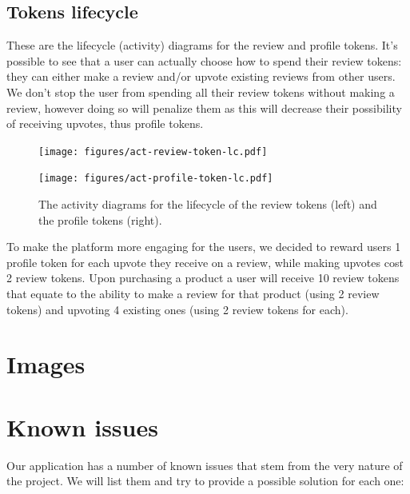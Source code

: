 \documentclass[12pt,a4paper,oneside]{article}
\theoremstyle{definition}
\begin{document}
\newpage

\subsection{Tokens lifecycle}

These are the lifecycle (activity) diagrams for the review and profile tokens.
It's possible to see that a user can actually choose how to spend their review tokens:
they can either make a review and/or upvote existing reviews from other users.
We don't stop the user from spending all their review tokens without making a review, however doing so will penalize them as this will decrease their possibility of receiving upvotes, thus profile tokens.

\begin{figure}[H]
	\centering
	\begin{minipage}{0.49\linewidth}
		\centering
		\texttt{[image: figures/act-review-token-lc.pdf]}
		\label{fig:act-review-token-lifecycle}
	\end{minipage}%
	\begin{minipage}{0.49\linewidth}
		\centering
		\texttt{[image: figures/act-profile-token-lc.pdf]}
		\label{fig:act-review-token-lifecycle}
	\end{minipage}
	\caption{The activity diagrams for the lifecycle of the review tokens (left) and the profile tokens (right).}
\end{figure}

To make the platform more engaging for the users, we decided to reward users 1 profile token for each upvote they receive on a review, while making upvotes cost 2 review tokens. Upon purchasing a product a user will receive 10 review tokens that equate to the ability to make a review for that product (using 2 review tokens) and upvoting 4 existing ones (using 2 review tokens for each).

\section{Images} %

\section{Known issues}

Our application has a number of known issues that stem from the very nature of the project. We will list them and try to provide a possible solution for each one:
\end{document}

